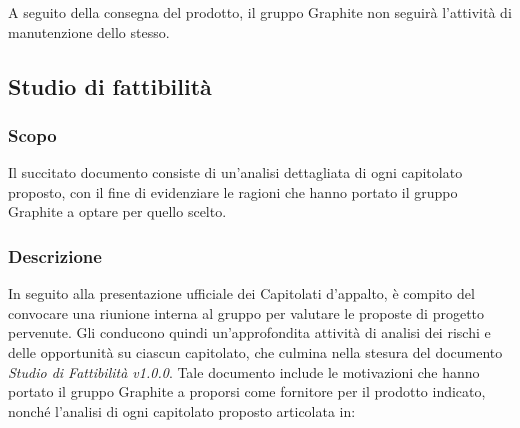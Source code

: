 \documentclass[../NormediProgetto.tex]{subfiles}
\begin{document}
A seguito della consegna del prodotto, il gruppo Graphite non seguirà l'attività di manutenzione dello stesso.



\subsection{Studio di fattibilità}

\subsubsection{Scopo}

Il succitato documento consiste di un'analisi dettagliata di ogni capitolato proposto, con il fine di evidenziare le ragioni che hanno portato il gruppo Graphite a optare per quello scelto. 

\subsubsection{Descrizione}

In seguito alla presentazione ufficiale dei Capitolati d'appalto, è compito del  convocare una riunione interna al gruppo per valutare le proposte di progetto pervenute. Gli  conducono quindi un'approfondita attività di analisi dei rischi e delle opportunità su ciascun capitolato, che culmina nella stesura del documento \textit{Studio di Fattibilità v1.0.0}.
Tale documento include le motivazioni che hanno portato il gruppo Graphite a proporsi come fornitore per il prodotto indicato, nonché l'analisi di ogni capitolato proposto articolata in:
\end{document}
